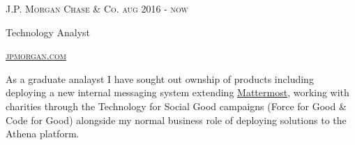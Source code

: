 {
  \textsc{\small{J.P. Morgan Chase \& Co. 
      \hfill
          {\raggedleft
              aug 2016 - now
          } \\
      }
  }
  {\raggedright\large {
   Technology Analyst 
  } \\}

  \textsc{\small\href{http://www.jpmorgan.com}{jpmorgan.com}}

  \normalsize{\raggedright
    As a graduate analayst I have sought out ownship of products including deploying a new internal messaging system extending \href{https://about.mattermost.com}{Mattermost}, working with charities through the Technology for Social Good campaigns (Force for Good \& Code for Good) alongside my normal business role of deploying solutions to the Athena platform.
  }
}